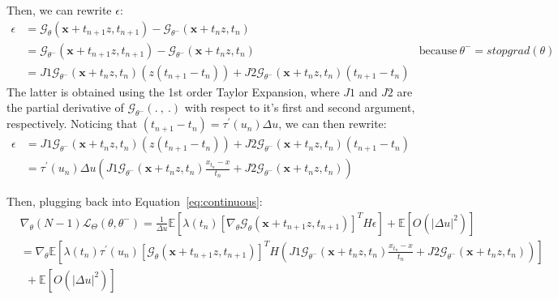 \noindent Then, we can rewrite $\epsilon$: 
\begin{align}
    \epsilon & = \mathcal{G}_{\theta}(\mathbf{x} + t_{n+1}z, t_{n+1}) - \mathcal{G}_{\theta^-}(\mathbf{x} + t_nz, t_{n}) \\
    & = \mathcal{G}_{\theta^{-}}(\mathbf{x} + t_{n+1}z, t_{n+1}) - \mathcal{G}_{\theta^-}(\mathbf{x} + t_nz, t_{n}) & \text{because} \: \theta^{-} = stopgrad(\theta) \\
    & = J1 \mathcal{G}_{\theta^-}(\mathbf{x} + t_nz, t_{n}) (z(t_{n+1} - t_n)) + J2 \mathcal{G}_{\theta^-}(\mathbf{x} + t_nz, t_{n})(t_{n+1} - t_n)
\end{align}
\noindent The latter is obtained using the 1st order Taylor Expansion, where $J1$ and $J2$ are the partial derivative of $\mathcal{G}_{\theta^-}(.\:,\: .)$ with respect to it's first and second argument, respectively. Noticing that $(t_{n+1} - t_n) = \tau^{'}(u_n)\Delta u$, we can then rewrite:
\begin{align}
    \epsilon  & = J1 \mathcal{G}_{\theta^-}(\mathbf{x} + t_nz, t_{n}) (z(t_{n+1} - t_n)) + J2 \mathcal{G}_{\theta^-}(\mathbf{x} + t_nz, t_{n})(t_{n+1} - t_n) \\
    & = \tau^{'}(u_n) \Delta u \left( J1 \mathcal{G}_{\theta^-}(\mathbf{x} + t_nz, t_{n}) \frac{x_{t_n} - x}{t_n} + J2 \mathcal{G}_{\theta^-}(\mathbf{x} + t_nz, t_{n}) \right)
\end{align}

\noindent Then, plugging back into Equation~\ref{eq:continuous}:
\begin{align}
     & \nabla_{\theta}(N - 1) \mathcal{L}_{\Theta}(\theta, \theta^{-}) = \frac{1}{\Delta u}\mathbb{E}\left[ \lambda(t_n) \left[\nabla_{\theta} \mathcal{G}_{\theta}(\mathbf{x} + t_{n+1}z, t_{n+1})\right]^T H \epsilon \right] + \mathbb{E}\left[O(|\Delta u|^2)\right] \\
     & = \nabla_{\theta} \mathbb{E}\left[ \lambda(t_n) \tau^{'}(u_n) \left[ \mathcal{G}_{\theta}(\mathbf{x} + t_{n+1}z, t_{n+1})\right]^T H 
     \left(J1 \mathcal{G}_{\theta^-}(\mathbf{x} + t_nz, t_{n}) \frac{x_{t_n} - x}{t_n} + J2 \mathcal{G}_{\theta^-}(\mathbf{x} + t_nz, t_{n}) \right)\right] \\
     & \: \: + \mathbb{E}\left[O(|\Delta u|^2)\right]
\end{align}

